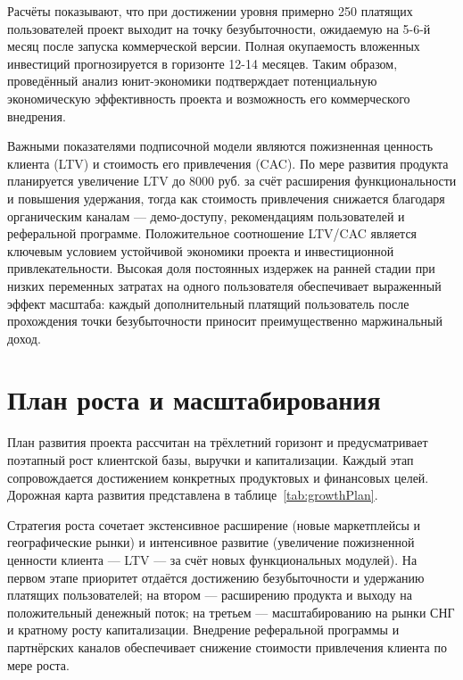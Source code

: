 Расчёты показывают, что при достижении уровня примерно 250 платящих пользователей проект выходит на точку безубыточности, ожидаемую на 5-6-й месяц после запуска коммерческой версии. Полная окупаемость вложенных инвестиций прогнозируется в горизонте 12-14 месяцев. Таким образом, проведённый анализ юнит-экономики подтверждает потенциальную экономическую эффективность проекта и возможность его коммерческого внедрения.

Важными показателями подписочной модели являются пожизненная ценность клиента (LTV) и стоимость его привлечения (CAC). По мере развития продукта планируется увеличение LTV до 8000 руб. за счёт расширения функциональности и повышения удержания, тогда как стоимость привлечения снижается благодаря органическим каналам --- демо-доступу, рекомендациям пользователей и реферальной программе. Положительное соотношение LTV/CAC является ключевым условием устойчивой экономики проекта и инвестиционной привлекательности. Высокая доля постоянных издержек на ранней стадии при низких переменных затратах на одного пользователя обеспечивает выраженный эффект масштаба: каждый дополнительный платящий пользователь после прохождения точки безубыточности приносит преимущественно маржинальный доход.

\section{План роста и масштабирования}

План развития проекта рассчитан на трёхлетний горизонт и предусматривает поэтапный рост клиентской базы, выручки и капитализации. Каждый этап сопровождается достижением конкретных продуктовых и финансовых целей. Дорожная карта развития представлена в таблице~\ref{tab:growthPlan}.

Стратегия роста сочетает экстенсивное расширение (новые маркетплейсы и географические рынки) и интенсивное развитие (увеличение пожизненной ценности клиента --- LTV --- за счёт новых функциональных модулей). На первом этапе приоритет отдаётся достижению безубыточности и удержанию платящих пользователей; на втором --- расширению продукта и выходу на положительный денежный поток; на третьем --- масштабированию на рынки СНГ и кратному росту капитализации. Внедрение реферальной программы и партнёрских каналов обеспечивает снижение стоимости привлечения клиента по мере роста.

